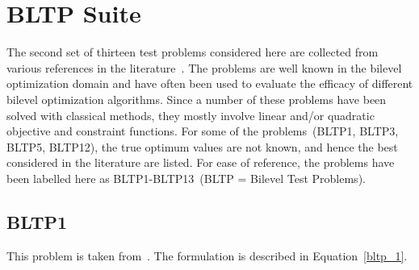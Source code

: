 \section{BLTP Suite}

The second set of thirteen test problems considered here are collected from various references in the literature~\cite{Angelobilevel,bard1988convex,rajesh2003tabu,aiyoshi1984solution,bard1982explicit,candler1982linear,oduguwa2002bi}. The problems are well known in the bilevel optimization domain and have often been used to evaluate the efficacy of different bilevel optimization algorithms. Since a number of these problems have been solved with classical methods, they mostly involve linear and/or quadratic objective and constraint functions. For some of the problems~(BLTP1, BLTP3, BLTP5, BLTP12), the true optimum values are not known, and hence the best considered in the literature are listed. For ease of reference, the problems have been labelled here as BLTP1-BLTP13~(BLTP = Bilevel Test Problems).


\subsection{BLTP1}

This problem is taken from~\cite{aiyoshi1984solution}. The formulation is described in Equation~\ref{bltp_1}. 



